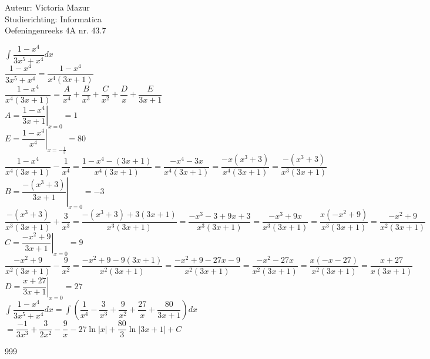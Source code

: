 \documentclass[a4paper]{article}
\begin{document}
  
\noindent \large Auteur: Victoria Mazur \\
\noindent \large Studierichting: Informatica\\
\noindent \large Oefeningenreeks 4A nr. 43.7\\

\medskip

\normalsize

$\displaystyle\int \dfrac{1-x^4}{3x^5+x^4}dx$\\

$\dfrac{1-x^4}{3x^5+x^4} = \dfrac{1-x^4}{x^4(3x+1)}$\\

$\dfrac{1-x^4}{x^4(3x+1)} = \dfrac{A}{x^4} + \dfrac{B}{x^3} + \dfrac{C}{x^2} + \dfrac{D}{x} + \dfrac{E}{3x+1}$\\

$A = \left. \dfrac{1-x^4}{3x+1} \right|_{x=0} = 1$\\

$E = \left. \dfrac{1-x^4}{x^4} \right|_{x=-\tfrac{1}{3}} = 80$\\

$\dfrac{1-x^4}{x^4(3x+1)} - \dfrac{1}{x^4} = \dfrac{1-x^4-(3x+1)}{x^4(3x+1)} = \dfrac{-x^4-3x}{x^4(3x+1)} = \dfrac{-x(x^3+3)}{x^4(3x+1)} = \dfrac{-(x^3+3)}{x^3(3x+1)}$\\

$B = \left. \dfrac{-(x^3+3)}{3x+1} \right|_{x=0} = -3$\\

$\dfrac{-(x^3+3)}{x^3(3x+1)} + \dfrac{3}{x^3} = \dfrac{-(x^3+3)+3(3x+1)}{x^3(3x+1)} = \dfrac{-x^3-3+9x+3}{x^3(3x+1)} = \dfrac{-x^3+9x}{x^3(3x+1)} = \dfrac{x(-x^2+9)}{x^3(3x+1)} = \dfrac{-x^2+9}{x^2(3x+1)}$\\

$C = \left. \dfrac{-x^2+9}{3x+1} \right|_{x=0} = 9$\\

$\dfrac{-x^2+9}{x^2(3x+1)} - \dfrac{9}{x^2} = \dfrac{-x^2+9-9(3x+1)}{x^2(3x+1)} = \dfrac{-x^2+9-27x-9}{x^2(3x+1)} = \dfrac{-x^2-27x}{x^2(3x+1)} = \dfrac{x(-x-27)}{x^2(3x+1)} = \dfrac{x+27}{x(3x+1)}$\\

$D = \left. \dfrac{x+27}{3x+1} \right|_{x=0} = 27$\\

$\displaystyle\int \dfrac{1-x^4}{3x^5+x^4}dx = \displaystyle\int \left( \dfrac{1}{x^4} - \dfrac{3}{x^3} + \dfrac{9}{x^2} + \dfrac{27}{x} + \dfrac{80}{3x+1} \right)dx$\\

$= \dfrac{-1}{3x^3} + \dfrac{3}{2x^2} - \dfrac{9}{x} - 27\ln|x| + \dfrac{80}{3}\ln|3x+1| + C$

\begin{thebibliography}{999}
\end{thebibliography}
\end{document}
